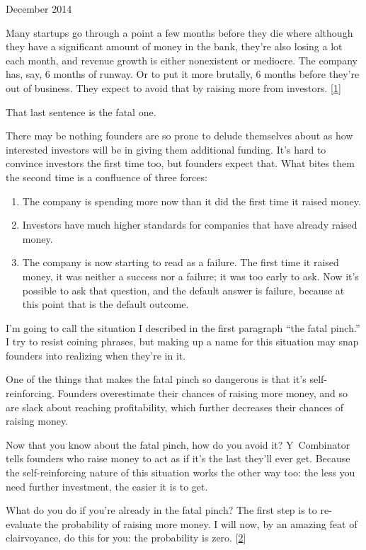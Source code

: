 December 2014

Many startups go through a point a few months before they die where
although they have a significant amount of money in the bank, they're
also losing a lot each month, and revenue growth is either nonexistent
or mediocre. The company has, say, 6 months of runway. Or to put it more
brutally, 6 months before they're out of business. They expect to avoid
that by raising more from investors. {[}\hyperref[f1n]{1}{]}

That last sentence is the fatal one.

There may be nothing founders are so prone to delude themselves about as
how interested investors will be in giving them additional funding. It's
hard to convince investors the first time too, but founders expect that.
What bites them the second time is a confluence of three forces:

\begin{enumerate}
\def\labelenumi{\arabic{enumi}.}
\item
  The company is spending more now than it did the first time it raised
  money.
\item
  Investors have much higher standards for companies that have already
  raised money.
\item
  The company is now starting to read as a failure. The first time it
  raised money, it was neither a success nor a failure; it was too early
  to ask. Now it's possible to ask that question, and the default answer
  is failure, because at this point that is the default outcome.
\end{enumerate}

I'm going to call the situation I described in the first paragraph ``the
fatal pinch.'' I try to resist coining phrases, but making up a name for
this situation may snap founders into realizing when they're in it.

One of the things that makes the fatal pinch so dangerous is that it's
self-reinforcing. Founders overestimate their chances of raising more
money, and so are slack about reaching profitability, which further
decreases their chances of raising money.

Now that you know about the fatal pinch, how do you avoid it?
Y~Combinator tells founders who raise money to act as if it's the last
they'll ever get. Because the self-reinforcing nature of this situation
works the other way too: the less you need further investment, the
easier it is to get.

What do you do if you're already in the fatal pinch? The first step is
to re-evaluate the probability of raising more money. I will now, by an
amazing feat of clairvoyance, do this for you: the probability is zero.
{[}\hyperref[f2n]{2}{]}

